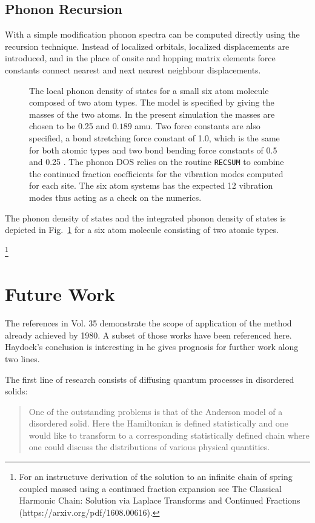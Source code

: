 \subsection{Phonon Recursion}
With a simple modification phonon spectra can be computed directly using the recursion technique.
Instead of localized orbitals, localized displacements are introduced, and in the place of onsite and hopping
matrix elements force constants connect nearest and next nearest neighbour displacements. 
%
\begin{figure}
\begin{center}
{\graphicspath{{./invariance/rec_examples/phonon/}}}
\caption{The local phonon density of states for a small six atom molecule composed of two atom types.
The model is specified by giving the masses of the two atoms. In the present simulation 
the masses are chosen to be 0.25 and $0.189$ amu. Two force constants are also
specified, a bond stretching force constant of 1.0, which is the same for both atomic types
and two bond bending force constants of 0.5 and 0.25 \label{fig:phonondos}. The phonon DOS relies on the routine
\texttt{RECSUM} to combine the continued fraction coefficients for the vibration modes computed for each
site. The six atom systems has the expected 12 vibration modes thus acting as a check on the numerics.}
\end{center}
\end{figure}
The phonon density of states and the integrated phonon density of states is depicted in Fig.~\ref{fig:phonondos} 
for a six atom molecule consisting of two atomic types. 


\footnote{For an instructuve derivation of the solution to an infinite chain of spring
coupled massed using a continued fraction expansion see 
The Classical Harmonic Chain: Solution via Laplace Transforms and Continued Fractions
(https://arxiv.org/pdf/1608.00616).
}

\section{Future Work}
The references in Vol. 35 demonstrate the scope of application of the method 
already achieved by 1980. A subset of those works have been referenced here. 
Haydock's conclusion is interesting in he gives prognosis for further work
along two lines. 

The first line of research consists of diffusing quantum processes in disordered
solids:
%
\begin{quote}
One of the outstanding problems is that of the Anderson model
of a disordered solid. Here the Hamiltonian is defined statistically and
one would like to transform to a corresponding statistically defined chain where
one could discuss the distributions of various physical quantities.
\end{quote}
%

